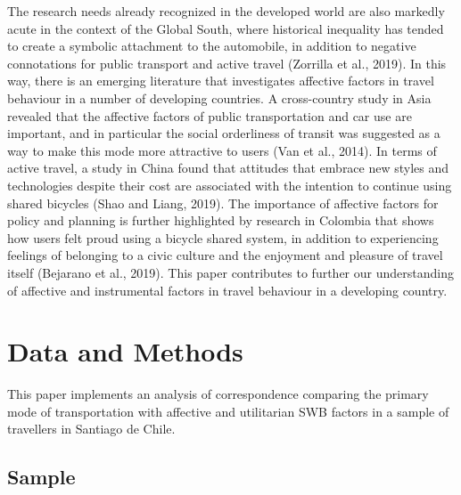 \documentclass[]{elsarticle} %
\begin{document}
The research needs already recognized in the developed world are also
markedly acute in the context of the Global South, where historical
inequality has tended to create a symbolic attachment to the automobile,
in addition to negative connotations for public transport and active
travel (Zorrilla et al., 2019). In this way, there is an emerging
literature that investigates affective factors in travel behaviour in a
number of developing countries. A cross-country study in Asia revealed
that the affective factors of public transportation and car use are
important, and in particular the social orderliness of transit was
suggested as a way to make this mode more attractive to users (Van et
al., 2014). In terms of active travel, a study in China found that
attitudes that embrace new styles and technologies despite their cost
are associated with the intention to continue using shared bicycles
(Shao and Liang, 2019). The importance of affective factors for policy
and planning is further highlighted by research in Colombia that shows
how users felt proud using a bicycle shared system, in addition to
experiencing feelings of belonging to a civic culture and the enjoyment
and pleasure of travel itself (Bejarano et al., 2019). This paper
contributes to further our understanding of affective and instrumental
factors in travel behaviour in a developing country.

\hypertarget{data-and-methods}{%
\section{Data and Methods}\label{data-and-methods}}

This paper implements an analysis of correspondence comparing the
primary mode of transportation with affective and utilitarian SWB
factors in a sample of travellers in Santiago de Chile.

\hypertarget{sample}{%
\subsection{Sample}\label{sample}}
\end{document}
